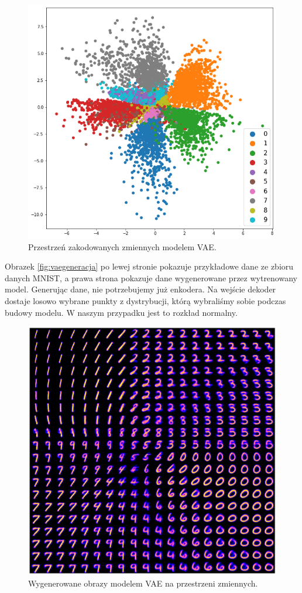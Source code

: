 \documentclass[a4paper,12pt,oneside]{book} %
\begin{document}
\begin{figure}[h!]
	\centering
	\includegraphics[width=14cm]{vaelatentspace.png}
	\caption{Przestrzeń zakodowanych zmiennych modelem VAE.}
	\label{fig:vaelatent}
\end{figure}
Obrazek \ref{fig:vaegeneracja} po lewej stronie pokazuje przykładowe dane ze zbioru danych MNIST, a prawa strona pokazuje dane wygenerowane przez wytrenowany model. Generując dane, nie potrzebujemy już enkodera. Na wejście dekoder dostaje losowo wybrane punkty z dystrybucji, którą wybraliśmy sobie podczas budowy modelu. W naszym przypadku jest to rozkład normalny.
\begin{figure}[h!]
	\centering
	\includegraphics[width=14cm]{vaelatentgen.png}
	\caption{Wygenerowane obrazy modelem VAE na przestrzeni zmiennych.}
	\label{fig:vaelatentgen}
\end{figure}
\end{document}

